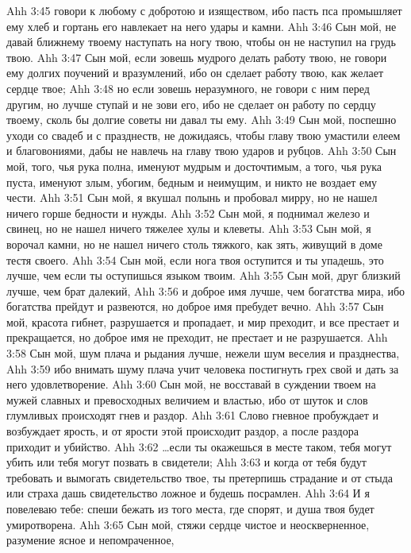\vs Ahh 3:45
говори к любому с добротою и изяществом, ибо пасть пса промышляет ему хлеб и гортань его навлекает на него удары и камни.
\vs Ahh 3:46
Сын мой, не давай ближнему твоему наступать на ногу твою, чтобы он не наступил на грудь твою.
\vs Ahh 3:47
Сын мой, если зовешь мудрого делать работу твою, не говори ему долгих поучений и вразумлений, ибо он сделает работу твою, как желает сердце твое;
\vs Ahh 3:48
но если зовешь неразумного, не говори с ним перед другим, но лучше ступай и не зови его, ибо не сделает он работу по сердцу твоему, сколь бы долгие советы ни давал ты ему.
\vs Ahh 3:49
Сын мой, поспешно уходи со свадеб и с празднеств, не дожидаясь, чтобы главу твою умастили елеем и благовониями, дабы не навлечь на главу твою ударов и рубцов.
\vs Ahh 3:50
Сын мой, того, чья рука полна, именуют мудрым и досточтимым, а того, чья рука пуста, именуют злым, убогим, бедным и неимущим, и никто не воздает ему чести.
\vs Ahh 3:51
Сын мой, я вкушал полынь и пробовал мирру, но не нашел ничего горше бедности и нужды.
\vs Ahh 3:52
Сын мой, я поднимал железо и свинец, но не нашел ничего тяжелее хулы и клеветы.
\vs Ahh 3:53
Сын мой, я ворочал камни, но не нашел ничего столь тяжкого, как зять, живущий в доме тестя своего.
\vs Ahh 3:54
Сын мой, если нога твоя оступится и ты упадешь, это лучше, чем если ты оступишься языком твоим.
\vs Ahh 3:55
Сын мой, друг близкий лучше, чем брат далекий,
\vs Ahh 3:56
и доброе имя лучше, чем богатства мира, ибо богатства прейдут и развеются, но доброе имя пребудет вечно.
\vs Ahh 3:57
Сын мой, красота гибнет, разрушается и пропадает, и мир преходит, и все престает и прекращается, но доброе имя не преходит, не престает и не разрушается.
\vs Ahh 3:58
Сын мой, шум плача и рыдания лучше, нежели шум веселия и празднества,
\vs Ahh 3:59
ибо внимать шуму плача учит человека постигнуть грех свой и дать за него удовлетворение.
\vs Ahh 3:60
Сын мой, не восставай в суждении твоем на мужей славных и превосходных величием и властью, ибо от шуток и слов глумливых происходят гнев и раздор.
\vs Ahh 3:61
Слово гневное пробуждает и возбуждает ярость, и от ярости этой происходит раздор, а после раздора приходит и убийство.
\vs Ahh 3:62
\ldots если ты окажешься в месте таком, тебя могут убить или тебя могут позвать в свидетели;
\vs Ahh 3:63
и когда от тебя будут требовать и вымогать свидетельство твое, ты претерпишь страдание и от стыда или страха дашь свидетельство ложное и будешь посрамлен.
\vs Ahh 3:64
И я повелеваю тебе: спеши бежать из того места, где спорят, и душа твоя будет умиротворена.
\vs Ahh 3:65
Сын мой, стяжи сердце чистое и неоскверненное, разумение ясное и непомраченное,
